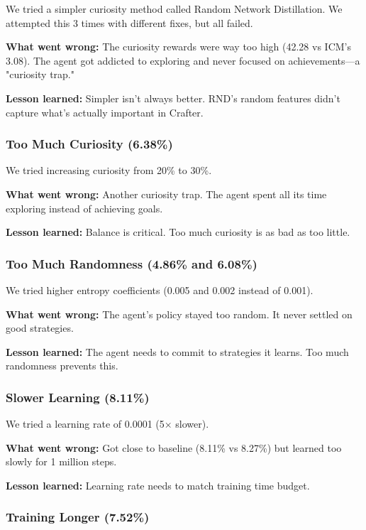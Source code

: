 \documentclass[conference]{IEEEtran}
\begin{document}
We tried a simpler curiosity method called Random Network Distillation. We attempted this 3 times with different fixes, but all failed.

\textbf{What went wrong:} The curiosity rewards were way too high (42.28 vs ICM's 3.08). The agent got addicted to exploring and never focused on achievements—a "curiosity trap."

\textbf{Lesson learned:} Simpler isn't always better. RND's random features didn't capture what's actually important in Crafter.

\subsubsection{Too Much Curiosity (6.38\%)}

We tried increasing curiosity from 20\% to 30\%.

\textbf{What went wrong:} Another curiosity trap. The agent spent all its time exploring instead of achieving goals.

\textbf{Lesson learned:} Balance is critical. Too much curiosity is as bad as too little.

\subsubsection{Too Much Randomness (4.86\% and 6.08\%)}

We tried higher entropy coefficients (0.005 and 0.002 instead of 0.001).

\textbf{What went wrong:} The agent's policy stayed too random. It never settled on good strategies.

\textbf{Lesson learned:} The agent needs to commit to strategies it learns. Too much randomness prevents this.

\subsubsection{Slower Learning (8.11\%)}

We tried a learning rate of 0.0001 (5× slower).

\textbf{What went wrong:} Got close to baseline (8.11\% vs 8.27\%) but learned too slowly for 1 million steps.

\textbf{Lesson learned:} Learning rate needs to match training time budget.

\subsubsection{Training Longer (7.52\%)}
\end{document}
